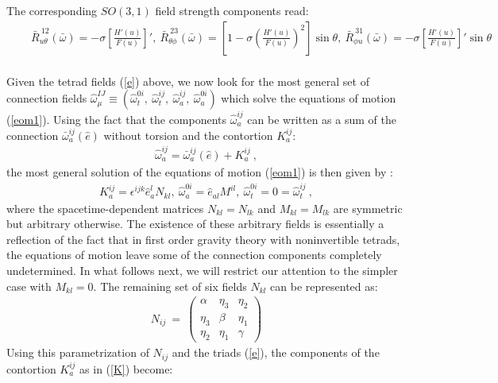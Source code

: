 \documentclass[preprint,aps,superscriptaddress,nofootinbib]{revtex4-1}
\begin{document}
The corresponding $SO(3,1)$ field strength components read: 
\begin{eqnarray}
&&\bar{R}_{u\theta}^{~12}(\bar{\omega})=-\sigma\left[\frac{H'(u)}
{F(u)}\right]',~\bar{R}_{\theta\phi}^{~23}
(\bar{\omega})=\left[1-\sigma\left(\frac{H'(u)}
{F(u)}\right)^2\right]\sin\theta,~\bar{R}_{\phi u}^{~31}(\bar{\omega})=-
\sigma\left[\frac{H'(u)}{F(u)}\right]'\sin\theta\nonumber\\
~
\end{eqnarray}
 

Given the tetrad fields (\ref{e})  above, we now look for the most 
general set of connection fields $\hat{\omega}_{\mu}^{IJ}\equiv 
(\hat{\omega}_{t}^{0i},~\hat{\omega}_{t}^{ij},~\hat{\omega}_{a}^{ij},
~\hat{\omega}_{a}^{0i})$ which solve  the   
equations of motion (\ref{eom1}). Using the fact that 
the components $\hat{\omega}_a^{ij}$ can be written as a sum of 
the connection $\bar{\omega}_a^{ij}(\hat{e})$ without torsion and 
the contortion $K_a^{ij}$:
\begin{eqnarray}
\hat{\omega}_{a}^{ij}=\bar{\omega}_a^{ij}(\hat{e})+K_a^{ij}~,
\end{eqnarray} 
the most general solution of the equations of motion (\ref{eom1}) is then 
given by \cite{kaul}:
\begin{eqnarray}\label{K}
K_a^{ij}=\epsilon^{ijk} \hat{e}_{a}^l 
N_{kl},~\hat{\omega}_{a}^{0i}=\hat{e}_{al} 
M^{il},~\hat{\omega}_{t}^{0i}=0=\hat{\omega}_{t}^{ij}~,
\end{eqnarray}
where the spacetime-dependent matrices $N_{kl}=N_{lk}$ and $M_{kl}=M_{lk}$ 
are symmetric but   arbitrary otherwise.
The existence of these arbitrary fields is essentially a reflection of 
the fact that in first order gravity theory with noninvertible tetrads, 
the equations of motion leave some of the 
connection components completely undetermined. 
In what follows next, we will restrict our attention to the simpler
case with $M_{kl}=0$. The remaining set of six fields $N_{kl}$ can be
represented as:
\begin{eqnarray}\label{N}
 N_{ij}~=~\left(\begin{array}{ccc}
\alpha & \eta_3 & \eta_2\\
\eta_3 & \beta & \eta_1\\
\eta_2 & \eta_1 & \gamma\end{array}\right) 
\end{eqnarray}
 Using this parametrization of $N^{}_{ij}$  and the triads (\ref{e}), 
 the components of the contortion $K_a^{ij}$ as in (\ref{K}) become:
\end{document}
